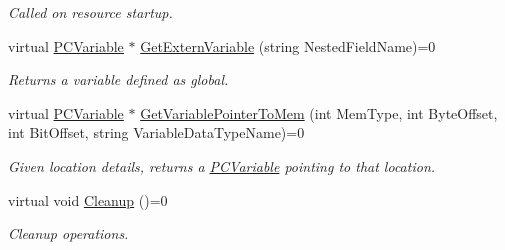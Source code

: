 \begin{DoxyCompactItemize}
\begin{DoxyCompactList}\small\item\em Called on resource startup. \end{DoxyCompactList}\item 
virtual \hyperlink{classpc__emulator_1_1PCVariable}{P\+C\+Variable} $\ast$ \hyperlink{classpc__emulator_1_1PCResource_aed5f515dbf5a2e5b680430741f49cfa0}{Get\+Extern\+Variable} (string Nested\+Field\+Name)=0
\begin{DoxyCompactList}\small\item\em Returns a variable defined as global. \end{DoxyCompactList}\item 
virtual \hyperlink{classpc__emulator_1_1PCVariable}{P\+C\+Variable} $\ast$ \hyperlink{classpc__emulator_1_1PCResource_a511c581ba122a73010f836c84947f332}{Get\+Variable\+Pointer\+To\+Mem} (int Mem\+Type, int Byte\+Offset, int Bit\+Offset, string Variable\+Data\+Type\+Name)=0
\begin{DoxyCompactList}\small\item\em Given location details, returns a \hyperlink{classpc__emulator_1_1PCVariable}{P\+C\+Variable} pointing to that location. \end{DoxyCompactList}\item 
virtual void \hyperlink{classpc__emulator_1_1PCResource_ad334064c7ae38db2fa54d7dd12b3ac26}{Cleanup} ()=0\hypertarget{classpc__emulator_1_1PCResource_ad334064c7ae38db2fa54d7dd12b3ac26}{}\label{classpc__emulator_1_1PCResource_ad334064c7ae38db2fa54d7dd12b3ac26}

\begin{DoxyCompactList}\small\item\em Cleanup operations. \end{DoxyCompactList}\end{DoxyCompactItemize}
